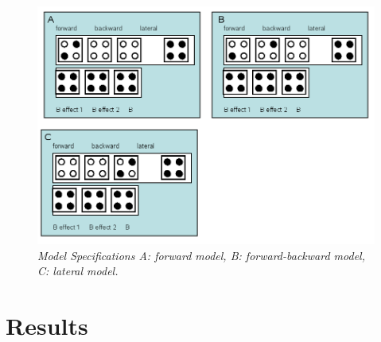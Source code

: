 \begin{figure}
\begin{center}
\includegraphics[width=140mm]{dcm_ssr/fig2}
\caption{\em Model Specifications A: forward model, B: forward-backward model, C: lateral model. \label{dcm_ssr:fig2}}
\end{center}
\end{figure}

\section{Results}

